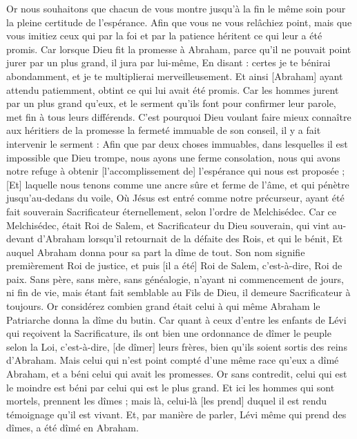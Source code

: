 \begin{multicols}{2}
Or nous souhaitons que chacun de vous montre jusqu'à la fin le même soin pour la pleine certitude de l'espérance.
Afin que vous ne vous relâchiez point, mais que vous imitiez ceux qui par la foi et par la patience héritent ce qui leur a été promis.
Car lorsque Dieu fit la promesse à Abraham, parce qu'il ne pouvait point jurer par un plus grand, il jura par lui-même,
En disant : certes je te bénirai abondamment, et je te multiplierai merveilleusement.
Et ainsi [Abraham] ayant attendu patiemment, obtint ce qui lui avait été promis.
Car les hommes jurent par un plus grand qu'eux, et le serment qu'ils font pour confirmer leur parole, met fin à tous leurs différends.
C'est pourquoi Dieu voulant faire mieux connaître aux héritiers de la promesse la fermeté immuable de son conseil, il y a fait intervenir le serment :
Afin que par deux choses immuables, dans lesquelles il est impossible que Dieu trompe, nous ayons une ferme consolation, nous qui avons notre refuge à obtenir [l'accomplissement de] l'espérance qui nous est proposée ;
[Et] laquelle nous tenons comme une ancre sûre et ferme de l'âme, et qui pénètre jusqu'au-dedans du voile,
Où Jésus est entré comme notre précurseur, ayant été fait souverain Sacrificateur éternellement, selon l'ordre de Melchisédec.
\VerseOne{}Car ce Melchisédec, était Roi de Salem, et Sacrificateur du Dieu souverain, qui vint au-devant d'Abraham lorsqu'il retournait de la défaite des Rois, et qui le bénit,
Et auquel Abraham donna pour sa part la dîme de tout. Son nom signifie premièrement Roi de justice, et puis [il a été] Roi de Salem, c'est-à-dire, Roi de paix.
Sans père, sans mère, sans généalogie, n'ayant ni commencement de jours, ni fin de vie, mais étant fait semblable au Fils de Dieu, il demeure Sacrificateur à toujours.
Or considérez combien grand était celui à qui même Abraham le Patriarche donna la dîme du butin.
Car quant à ceux d'entre les enfants de Lévi qui reçoivent la Sacrificature, ils ont bien une ordonnance de dîmer le peuple selon la Loi, c'est-à-dire, [de dîmer] leurs frères, bien qu'ils soient sortis des reins d'Abraham.
Mais celui qui n'est point compté d'une même race qu'eux a dîmé Abraham, et a béni celui qui avait les promesses.
Or sans contredit, celui qui est le moindre est béni par celui qui est le plus grand.
Et ici les hommes qui sont mortels, prennent les dîmes ; mais là, celui-là [les prend] duquel il est rendu témoignage qu'il est vivant.
Et, par manière de parler, Lévi même qui prend des dîmes, a été dîmé en Abraham.

\end{multicols}
